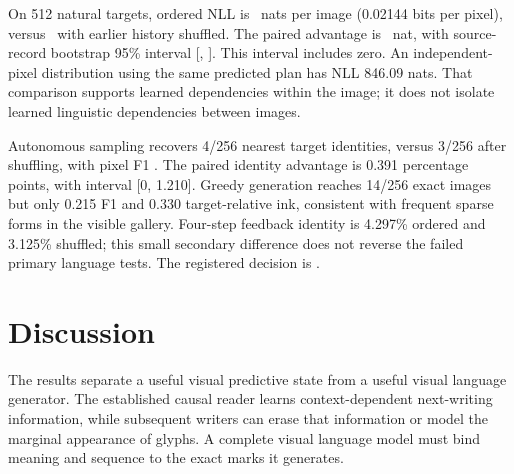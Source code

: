 On 512 natural targets, ordered NLL is \DensityNll\ nats per image
(0.02144 bits per pixel), versus \DensityShuffledNll\ with earlier history
shuffled. The paired advantage is \DensityAdvantage\ nat, with source-record
bootstrap 95\% interval [\DensityLow, \DensityHigh]. This interval includes
zero. An independent-pixel distribution using the same predicted plan has NLL
846.09 nats. That comparison supports learned dependencies within the image;
it does not isolate learned linguistic dependencies between images.

Autonomous sampling recovers 4/256 nearest target identities, versus 3/256
after shuffling, with pixel F1 \DensityFone. The paired identity advantage is
0.391 percentage points, with interval [0, 1.210]. Greedy generation reaches
14/256 exact images but only 0.215 F1 and 0.330 target-relative ink, consistent
with frequent sparse forms in the visible gallery. Four-step feedback identity
is 4.297\% ordered and 3.125\% shuffled; this small secondary difference does
not reverse the failed primary language tests. The registered decision is
\texttt{\DensityDecision}.


\section*{Discussion}
The results separate a useful visual predictive state from a useful visual
language generator. The established causal reader learns context-dependent
next-writing information, while subsequent writers can erase that information
or model the marginal appearance of glyphs. A complete visual language model
must bind meaning and sequence to the exact marks it generates.

